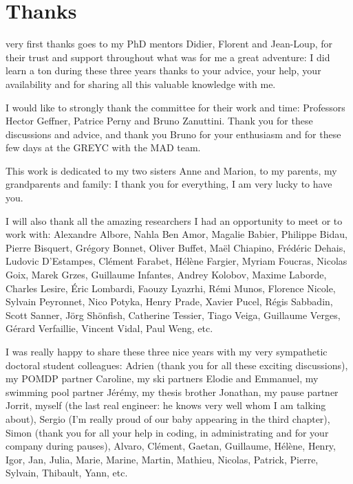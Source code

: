 \chapter*{Thanks}
\vspace{-2cm}
 very first thanks goes to my PhD mentors Didier, Florent and Jean-Loup,
for their trust and support throughout what was for me a great adventure:
I did learn a ton during these three years thanks to your advice, 
your help, 
your availability 
and for sharing all this valuable knowledge with me.

I would like to strongly thank the committee for their work and time: 
Professors Hector Geffner, Patrice Perny and Bruno Zanuttini.
Thank you for these discussions and advice, 
and thank you Bruno for your enthusiasm 
and for these few days at the GREYC with the MAD team.

This work is dedicated to my two sisters Anne and Marion, 
to my parents, my grandparents and family: 
I thank you for everything, I am very lucky to have you.

I will also thank all the amazing researchers 
I had an opportunity to meet or to work with:
Alexandre Albore,
Nahla Ben Amor,
Magalie Babier,
Philippe Bidau, 
Pierre Bisquert,
Gr\'egory Bonnet,
Oliver Buffet,
Ma\"el Chiapino,
Fr\'ed\'eric Dehais,
Ludovic D'Estampes,
Cl\'ement Farabet,
H\'el\`ene Fargier,
Myriam Foucras, 
Nicolas Goix,
Marek Grzes, 
Guillaume Infantes,
Andrey Kolobov,
Maxime Laborde,
Charles Lesire,
\'Eric Lombardi,
Faouzy Lyazrhi,
R\'emi Munos,
Florence Nicole,
Sylvain Peyronnet,
Nico Potyka,
Henry Prade,
Xavier Pucel,
R\'egis Sabbadin, 
Scott Sanner,
J\"org Sh\"onfish,
Catherine Tessier,
Tiago Veiga,
Guillaume Verges,
G\'erard Verfaillie,
Vincent Vidal,
Paul Weng, etc.






I was really happy to share these three nice years with
my very sympathetic doctoral student colleagues: 
Adrien (thank you for all these exciting discussions), 
my POMDP partner Caroline,
my ski partners Elodie and Emmanuel,
my swimming pool partner J\'er\'emy, 
my thesis brother Jonathan, 
my pause partner Jorrit, 
myself (the last real engineer: he knows very well whom I am talking about), 
Sergio (I'm really proud of our baby appearing in the third chapter),  
Simon (thank you for all your help in coding, in administrating and for your company during pauses), 
Alvaro, Cl\'ement, Gaetan, Guillaume, H\'el\`ene, Henry, Igor, Jan, Julia, Marie, Marine, Martin, Mathieu, Nicolas, Patrick, Pierre, Sylvain, Thibault, Yann, etc.

